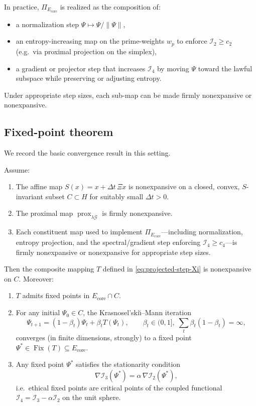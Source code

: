 \documentclass[11pt]{article}
\begin{document}
In practice, $\Pi_{E_{\mathrm{core}}}$ is realized as the composition of:
\begin{itemize}[leftmargin=*]
  \item a normalization step $\Psi\mapsto \Psi/\|\Psi\|$,
  \item an entropy-increasing map on the prime-weights $w_p$ to enforce $\mathcal{I}_2\ge c_2$
        (e.g.\ via proximal projection on the simplex),
  \item a gradient or projector step that increases $\mathcal{I}_4$ by moving $\Psi$ toward
        the lawful subspace while preserving or adjusting entropy.
\end{itemize}

Under appropriate step sizes, each sub-map can be made firmly nonexpansive or nonexpansive.

\subsection{Fixed-point theorem}

We record the basic convergence result in this setting.

\begin{theorem}
Assume:
\begin{enumerate}[label=(\roman*),leftmargin=*]
  \item The affine map $S(x) = x + \Delta t\,\Xi x$ is nonexpansive on a closed, convex,
        $S$-invariant subset $C\subset H$ for suitably small $\Delta t>0$.
  \item The proximal map $\operatorname{prox}_{\lambda\mathcal{G}}$ is firmly nonexpansive.
  \item Each constituent map used to implement $\Pi_{E_{\mathrm{core}}}$---including normalization,
        entropy projection, and the spectral/gradient step enforcing $\mathcal{I}_4\ge c_4$---is
        firmly nonexpansive or nonexpansive for appropriate step sizes.
\end{enumerate}
Then the composite mapping $T$ defined in \eqref{eq:projected-step-Xi} is nonexpansive on $C$.
Moreover:
\begin{enumerate}[label=(\alph*),leftmargin=*]
  \item $T$ admits fixed points in $E_{\mathrm{core}}\cap C$.
  \item For any initial $\Psi_0\in C$, the Krasnosel'ski\u{\i}--Mann iteration
    \[
      \Psi_{t+1} = (1-\beta_t)\Psi_t + \beta_t T(\Psi_t),\qquad
      \beta_t\in(0,1],\;\sum_t \beta_t(1-\beta_t)=\infty,
    \]
    converges (in finite dimensions, strongly) to a fixed point $\Psi^*\in\operatorname{Fix}(T)\subseteq E_{\mathrm{core}}$.
  \item Any fixed point $\Psi^*$ satisfies the stationarity condition
    \[
      \nabla\mathcal{I}_3(\Psi^*) = \alpha\,\nabla\mathcal{I}_2(\Psi^*),
    \]
    i.e.\ ethical fixed points are critical points of the coupled functional
    $\mathcal{I}_4=\mathcal{I}_3-\alpha\mathcal{I}_2$ on the unit sphere.
\end{enumerate}
\end{theorem}
\end{document}
